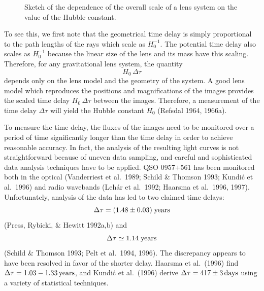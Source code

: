 \documentclass[a4paper,10pt]{article} %
\begin{document}
\begin{figure}[ht] %
\begin{center}
\begin{minipage}[t]{0.6\hsize}
\end{minipage}
\end{center}
\caption{Sketch of the dependence of the overall scale of a lens
  system on the value of the Hubble constant.}
\label{NB:fig3.9}
\end{figure}

To see this, we first note that the geometrical time delay is simply
proportional to the path lengths of the rays which scale as
$H_0^{-1}$. The potential time delay also scales as $H_0^{-1}$ because
the linear size of the lens and its mass have this scaling.
Therefore, for any gravitational lens system, the quantity
\begin{equation}
  H_0\,\Delta\tau
\label{eq:3.36}
\end{equation}
depends only on the lens model and the geometry of the system. A good
lens model which reproduces the positions and magnifications of the
images provides the scaled time delay $H_0\,\Delta\tau$ between the
images. Therefore, a measurement of the time delay $\Delta\tau$ will
yield the Hubble constant $H_0$ (Refsdal 1964, 1966a).

To measure the time delay, the fluxes of the images need to be
monitored over a period of time significantly longer than the time
delay in order to achieve reasonable accuracy. In fact, the analysis
of the resulting light curves is not straightforward because of uneven
data sampling, and careful and sophisticated data analysis techniques
have to be applied. QSO 0957$+$561 has been monitored both in the
optical (Vanderriest et al.\ 1989; Schild \& Thomson 1993; Kundi\'c et
al.\ 1996) and radio wavebands (Leh\'ar et al.\ 1992; Haarsma et al.\
1996, 1997). Unfortunately, analysis of the data has led to two
claimed time delays:
\begin{equation}
  \Delta\tau = (1.48\pm0.03)\;\hbox{\rm years}
\label{eq:3.37}
\end{equation}
(Press, Rybicki, \& Hewitt 1992a,b) and
\begin{equation}
  \Delta\tau \simeq 1.14\;\hbox{\rm years}
\label{eq:3.38}
\end{equation}
(Schild \& Thomson 1993; Pelt et al.\ 1994, 1996). The discrepancy
appears to have been resolved in favor of the shorter delay. Haarsma
et al.\ (1996) find $\Delta\tau=1.03-1.33\,{\rm years}$, and Kundi\'c
et al.\ (1996) derive $\Delta\tau=417\pm3\,{\rm days}$ using a variety
of statistical techniques.
\end{document}
